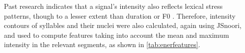 \documentclass[a4paper]{article}
\begin{document}
	    Past research indicates that a signal's intensity also reflects lexical stress patterns, though to a lesser extent than duration or F0 \cite{Cutler2005,Dogil1999}.
	   Therefore, intensity contours of syllables and their nuclei were also calculated, again using JSnoori,
	   and used to compute features taking into account the mean and maximum intensity in the relevant segments, as shown in \cref{tab:enerfeatures}.
	   
	    
	   
\end{document}

